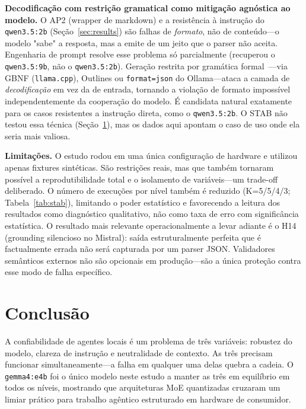 \documentclass{kdmile}
\begin{document}
\textbf{Decodificação com restrição gramatical como mitigação agnóstica ao
modelo.}
O AP2 (wrapper de markdown) e a resistência à instrução do
\texttt{qwen3.5:2b} (Seção~\ref{sec:results}) são falhas de \emph{formato}, não
de conteúdo—\allowbreak o modelo "sabe" a resposta, mas a emite de um jeito que o parser
não aceita. Engenharia de prompt resolve esse problema só parcialmente
(recuperou o \texttt{qwen3.5:9b}, não o \texttt{qwen3.5:2b}). Geração restrita
por gramática formal~\cite{geng2023}—\allowbreak via GBNF (\texttt{llama.cpp}), Outlines ou
\texttt{format=json} do Ollama—\allowbreak ataca a camada de \emph{decodificação} em vez da
de entrada, tornando a violação de formato impossível independentemente da
cooperação do modelo. É candidata natural exatamente para os casos resistentes
a instrução direta, como o \texttt{qwen3.5:2b}. O STAB não testou essa técnica
(Seção~\ref{sec:conclusion}), mas os dados aqui apontam o caso de uso onde ela
seria mais valiosa.

\textbf{Limitações.}
O estudo rodou em uma única configuração de hardware e utilizou apenas fixtures
sintéticas. São restrições reais, mas que também tornaram possível a
reprodutibilidade total e o isolamento de variáveis—\allowbreak um trade-off deliberado.
O número de execuções por nível também é reduzido (K=5/5/4/3; Tabela~\ref{tab:stab}),
limitando o poder estatístico e favorecendo a leitura dos resultados como
diagnóstico qualitativo, não como taxa de erro com significância estatística.
O resultado mais relevante operacionalmente a levar adiante é o H14 (grounding
silencioso no Mistral): saída estruturalmente perfeita que é factualmente errada
não será capturada por um parser JSON.
Validadores semânticos externos não são opcionais em produção—\allowbreak são a única
proteção contra esse modo de falha específico.

\section{Conclusão}
\label{sec:conclusion}

A confiabilidade de agentes locais é um problema de três variáveis: robustez do
modelo, clareza de instrução e neutralidade de contexto.
As três precisam funcionar simultaneamente—\allowbreak a falha em qualquer uma delas quebra
a cadeia.
O \texttt{gemma4:e4b} foi o único modelo neste estudo a manter as três em
equilíbrio em todos os níveis, mostrando que arquiteturas MoE quantizadas
cruzaram um limiar prático para trabalho agêntico estruturado em hardware de
consumidor.
\end{document}
